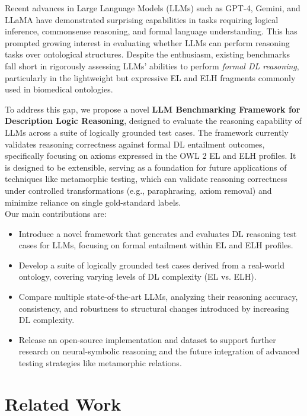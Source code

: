 \documentclass[11pt]{article}
\begin{document}
Recent advances in Large Language Models (LLMs) such as GPT-4, Gemini, and LLaMA have demonstrated surprising capabilities in tasks requiring logical inference, commonsense reasoning, and formal language understanding. 
This has prompted growing interest in evaluating whether LLMs can perform reasoning tasks over ontological structures. 
Despite the enthusiasm, existing benchmarks fall short in rigorously assessing LLMs' abilities to perform \textit{formal DL reasoning}, particularly in the lightweight but expressive EL and ELH fragments commonly used in biomedical ontologies\cite{baader2005el}.

To address this gap, we propose a novel \textbf{LLM Benchmarking Framework for Description Logic Reasoning}, designed to evaluate the reasoning capability of LLMs across a suite of logically grounded test cases. 
The framework currently validates reasoning correctness  against formal DL entailment outcomes, specifically focusing on axioms expressed in the OWL 2 EL and ELH profiles.
It is designed to be extensible, serving as a foundation for future applications of techniques like metamorphic testing, which can validate reasoning correctness under controlled transformations (e.g., paraphrasing, axiom removal) and minimize reliance on single gold-standard labels.\\

Our main contributions are:
\begin{itemize}
    \item Introduce a novel framework that generates and evaluates DL reasoning test cases for LLMs, focusing on formal entailment within EL and ELH profiles.
    \item Develop a suite of logically grounded test cases derived from a real-world ontology, covering varying levels of DL complexity (EL vs. ELH).
    \item Compare multiple state-of-the-art LLMs, analyzing their reasoning accuracy, consistency, and robustness to structural changes introduced by increasing DL complexity.
    \item Release an open-source implementation and dataset to support further research on neural-symbolic reasoning and the future integration of advanced testing strategies like metamorphic relations\cite{sun2024metamorphic}.
\end{itemize}

\section{Related Work}
\end{document}
